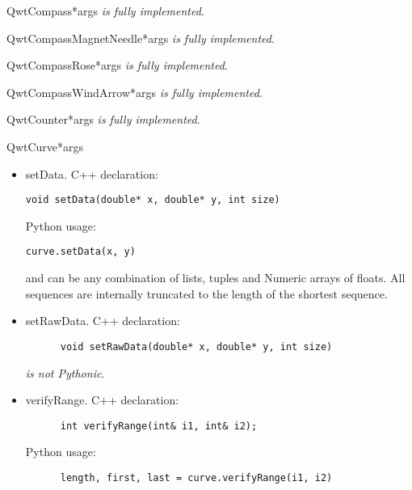 \documentclass{manual}
\begin{document}
\begin{classdesc}{QwtCompass}{*args}
\emph{is fully implemented}.
\end{classdesc}

\begin{classdesc}{QwtCompassMagnetNeedle}{*args}
\emph{is fully implemented}.
\end{classdesc}

\begin{classdesc}{QwtCompassRose}{*args}
\emph{is fully implemented}.
\end{classdesc}

\begin{classdesc}{QwtCompassWindArrow}{*args}
\emph{is fully implemented}.
\end{classdesc}

\begin{classdesc}{QwtCounter}{*args}
\emph{is fully implemented}.
\end{classdesc}

\begin{classdesc}{QwtCurve}{*args}

  \begin{itemize}

    \item{setData}. C++ declaration:
      \begin{verbatim}
void setData(double* x, double* y, int size)
      \end{verbatim}
      Python usage:
      \begin{verbatim}
curve.setData(x, y)
      \end{verbatim}
       and  can be any combination of lists, tuples and Numeric
      arrays of floats.
      All sequences are internally truncated to the length of the shortest
      sequence.

    \item{setRawData}. C++ declaration:
      \begin{verbatim}
      void setRawData(double* x, double* y, int size)
      \end{verbatim}
       \emph{is not Pythonic}.

    \item{verifyRange}. C++ declaration:
      \begin{verbatim}
      int verifyRange(int& i1, int& i2);
      \end{verbatim}
      Python usage:
      \begin{verbatim}
      length, first, last = curve.verifyRange(i1, i2)
      \end{verbatim}

  \end{itemize}
\end{classdesc}
\end{document}
